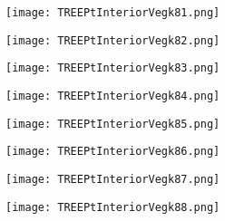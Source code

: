 \documentclass[pdf]{beamer}
\begin{document}
\begin{frame}
\begin{figure}[!h]
\centering
\texttt{[image: TREEPtInteriorVegk81.png]}
\end{figure}
\end{frame}

\begin{frame}
\begin{figure}[!h]
\centering
\texttt{[image: TREEPtInteriorVegk82.png]}
\end{figure}
\end{frame}

\begin{frame}
\begin{figure}[!h]
\centering
\texttt{[image: TREEPtInteriorVegk83.png]}
\end{figure}
\end{frame}

\begin{frame}
\begin{figure}[!h]
\centering
\texttt{[image: TREEPtInteriorVegk84.png]}
\end{figure}
\end{frame}

\begin{frame}
\begin{figure}[!h]
\centering
\texttt{[image: TREEPtInteriorVegk85.png]}
\end{figure}
\end{frame}

\begin{frame}
\begin{figure}[!h]
\centering
\texttt{[image: TREEPtInteriorVegk86.png]}
\end{figure}
\end{frame}

\begin{frame}
\begin{figure}[!h]
\centering
\texttt{[image: TREEPtInteriorVegk87.png]}
\end{figure}
\end{frame}

\begin{frame}
\begin{figure}[!h]
\centering
\texttt{[image: TREEPtInteriorVegk88.png]}
\end{figure}
\end{frame}
\end{document}

